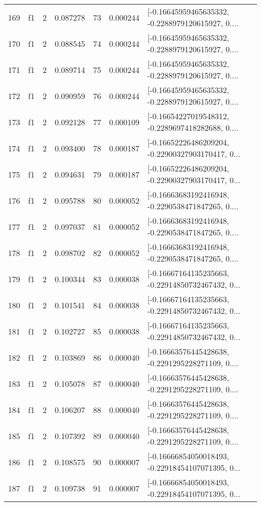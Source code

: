 \begin{tabular}{lllrlrl}
169 &  f1 &   2 &  0.087278 &   73 &  0.000244 &  [-0.16645959465635332, -0.2288979120615927, 0.... \\
170 &  f1 &   2 &  0.088545 &   74 &  0.000244 &  [-0.16645959465635332, -0.2288979120615927, 0.... \\
171 &  f1 &   2 &  0.089714 &   75 &  0.000244 &  [-0.16645959465635332, -0.2288979120615927, 0.... \\
172 &  f1 &   2 &  0.090959 &   76 &  0.000244 &  [-0.16645959465635332, -0.2288979120615927, 0.... \\
173 &  f1 &   2 &  0.092128 &   77 &  0.000109 &  [-0.16654227019548312, -0.2289697418282688, 0.... \\
174 &  f1 &   2 &  0.093400 &   78 &  0.000187 &  [-0.16652226486209204, -0.22900327903170417, 0... \\
175 &  f1 &   2 &  0.094631 &   79 &  0.000187 &  [-0.16652226486209204, -0.22900327903170417, 0... \\
176 &  f1 &   2 &  0.095788 &   80 &  0.000052 &  [-0.16663683192416948, -0.2290538471847265, 0.... \\
177 &  f1 &   2 &  0.097037 &   81 &  0.000052 &  [-0.16663683192416948, -0.2290538471847265, 0.... \\
178 &  f1 &   2 &  0.098702 &   82 &  0.000052 &  [-0.16663683192416948, -0.2290538471847265, 0.... \\
179 &  f1 &   2 &  0.100344 &   83 &  0.000038 &  [-0.16667164135235663, -0.22914850732467432, 0... \\
180 &  f1 &   2 &  0.101541 &   84 &  0.000038 &  [-0.16667164135235663, -0.22914850732467432, 0... \\
181 &  f1 &   2 &  0.102727 &   85 &  0.000038 &  [-0.16667164135235663, -0.22914850732467432, 0... \\
182 &  f1 &   2 &  0.103869 &   86 &  0.000040 &  [-0.16663576445428638, -0.2291295228271109, 0.... \\
183 &  f1 &   2 &  0.105078 &   87 &  0.000040 &  [-0.16663576445428638, -0.2291295228271109, 0.... \\
184 &  f1 &   2 &  0.106207 &   88 &  0.000040 &  [-0.16663576445428638, -0.2291295228271109, 0.... \\
185 &  f1 &   2 &  0.107392 &   89 &  0.000040 &  [-0.16663576445428638, -0.2291295228271109, 0.... \\
186 &  f1 &   2 &  0.108575 &   90 &  0.000007 &  [-0.16666854050018493, -0.22918454107071395, 0... \\
187 &  f1 &   2 &  0.109738 &   91 &  0.000007 &  [-0.16666854050018493, -0.22918454107071395, 0... \\

\end{tabular}
